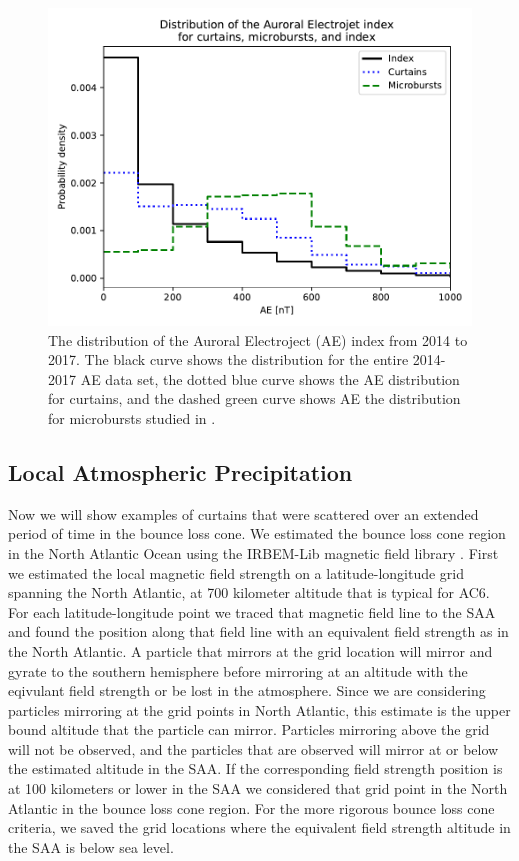 \documentclass[draft]{agujournal2019}
\begin{document}
\begin{figure}
\includegraphics[width=\textwidth]{ac6_curtain_microburst_AE_dist.pdf}
\caption{The distribution of the Auroral Electroject (AE) index from 2014 to 2017. The black curve shows the distribution for the entire 2014-2017 AE data set, the dotted blue curve shows the AE distribution for curtains, and the dashed green curve shows AE the distribution for microbursts studied in .}
\label{ae_dist}
\end{figure}

\subsection{Local Atmospheric Precipitation}
Now we will show examples of curtains that were scattered over an extended period of time in the bounce loss cone. We estimated the bounce loss cone region in the North Atlantic Ocean using the IRBEM-Lib magnetic field library \cite{irbem}. First we estimated the local magnetic field strength on a latitude-longitude grid spanning the North Atlantic, at 700 kilometer altitude that is typical for AC6. For each latitude-longitude point we traced that magnetic field line to the SAA and found the position along that field line with an equivalent field strength as in the North Atlantic. A particle that mirrors at the grid location will mirror and gyrate to the southern hemisphere before mirroring at an altitude with the eqivulant field strength or be lost in the atmosphere. Since we are considering particles mirroring at the grid points in North Atlantic, this estimate is the upper bound altitude that the particle can mirror. Particles mirroring above the grid will not be observed, and the particles that are observed will mirror at or below the estimated altitude in the SAA. If the corresponding field strength position is at 100 kilometers or lower in the SAA we considered that grid point in the North Atlantic in the bounce loss cone region. For the more rigorous bounce loss cone criteria, we saved the grid locations where the equivalent field strength altitude in the SAA is below sea level. 
\end{document}
